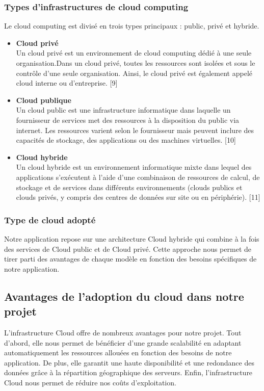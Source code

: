 \subsubsection{Types d'infrastructures de cloud computing}
\justifying
Le cloud computing est divisé en trois types principaux : public, privé et hybride.
\begin{itemize}[itemsep=2pt, parsep=2pt]
    \item \textbf{Cloud privé}\\ Un cloud privé est un environnement de cloud computing dédié à une seule organisation.Dans un cloud privé, toutes les ressources sont isolées et sous le contrôle d'une seule organisation. Ainsi, le cloud privé est également appelé cloud interne ou d'entreprise. [9]
    \item \textbf{Cloud publique}\\ Un cloud public est une infrastructure informatique dans laquelle un fournisseur de services met des ressources à la disposition du public via internet. Les ressources varient selon le fournisseur mais peuvent inclure des capacités de stockage, des applications ou des machines virtuelles. [10]
    \item \textbf{Cloud hybride}\\ Un cloud hybride est un environnement informatique mixte dans lequel des applications s'exécutent à l'aide d'une combinaison de ressources de calcul, de stockage et de services dans différents environnements (clouds publics et clouds privés, y compris des centres de données sur site ou en périphérie). [11] 
\end{itemize}

\subsubsection{Type de cloud adopté }
\justifying
Notre application repose sur une architecture Cloud hybride qui combine à la fois des services de Cloud public et de Cloud privé. Cette approche nous permet de tirer parti des avantages de chaque modèle en fonction des besoins spécifiques de notre application. 

\subsection{Avantages de l’adoption du cloud dans notre projet}
\justifying
L'infrastructure Cloud offre de nombreux avantages pour notre projet. Tout d'abord, elle nous permet de bénéficier d'une grande scalabilité en adaptant automatiquement les ressources allouées en fonction des besoins de notre application. De plus, elle garantit une haute disponibilité et une redondance des données grâce à la répartition géographique des serveurs. Enfin, l'infrastructure Cloud nous permet de réduire nos coûts d'exploitation. 

